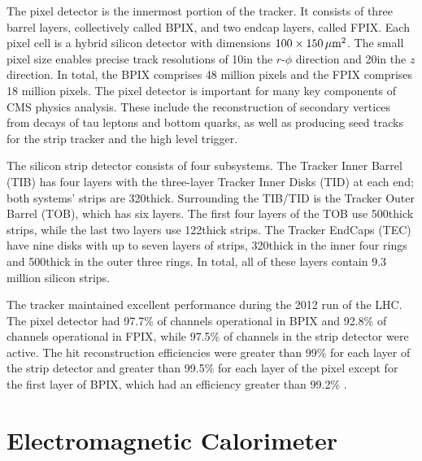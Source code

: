 \documentclass[12pt]{thesis}  %
\begin{document}
The pixel detector is the innermost portion of the tracker. It consists of three barrel layers, collectively called BPIX, and two endcap layers, called FPIX. Each pixel cell is a hybrid silicon detector with dimensions $100\times150\,\mu\text{m}^{2}$. The small pixel size enables precise track resolutions of 10\mum in the $r$-$\phi$ direction and 20\mum in the $z$ direction. In total, the BPIX comprises 48 million pixels and the FPIX comprises 18 million pixels. The pixel detector is important for many key components of CMS physics analysis. These include the reconstruction of secondary vertices from decays of tau leptons and bottom quarks, as well as producing seed tracks for the strip tracker and the high level trigger.

The silicon strip detector consists of four subsystems. The Tracker Inner Barrel (TIB) has four layers with the three-layer Tracker Inner Disks (TID) at each end; both systems' strips are 320\mum thick. Surrounding the TIB/TID is the Tracker Outer Barrel (TOB), which has six layers. The first four layers of the TOB use 500\mum thick strips, while the last two layers use 122\mum thick strips. The Tracker EndCaps (TEC) have nine disks with up to seven layers of strips, 320\mum thick in the inner four rings and 500\mum thick in the outer three rings. In total, all of these layers contain 9.3 million silicon strips.

The tracker maintained excellent performance during the 2012 run of the LHC. The pixel detector had 97.7\% of channels operational in BPIX and 92.8\% of channels operational in FPIX, while 97.5\% of channels in the strip detector were active. The hit reconstruction efficiencies were greater than 99\% for each layer of the strip detector and greater than 99.5\% for each layer of the pixel except for the first layer of BPIX, which had an efficiency greater than 99.2\% \cite{Veszpremi:2014hpa}. 

\section{Electromagnetic Calorimeter}
\end{document}
